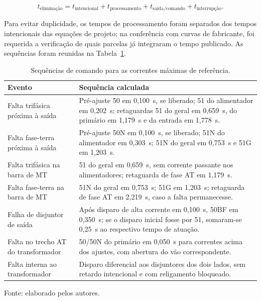 \begin{equation}
    t_{\text{eliminação}}=
    t_{\text{intencional}}+t_{\text{processamento}}+
    t_{\text{saída/comando}}+t_{\text{interrupção}}.
    \label{eq:oc_eliminacao}
\end{equation}

Para evitar duplicidade, os tempos de processamento foram separados dos tempos intencionais das equações de projeto; na conferência com curvas de fabricante, foi requerida a verificação de quais parcelas já integraram o tempo publicado. As sequências foram reunidas na Tabela~\ref{tab:oc_eventos}.

\begin{table}[htbp]
    \centering
    \caption{Sequências de comando para as correntes máximas de referência.}
    \label{tab:oc_eventos}
    \begin{tabular}{p{4.1cm}p{10.8cm}}
        \hline
        \textbf{Evento} & \textbf{Sequência calculada}\\
        \hline
        Falta trifásica próxima à saída & Pré-ajuste 50 em 0,100~s, se liberado; 51 do alimentador em 0,202~s; retaguardas 51 do geral em 0,659~s, do primário em 1,179~s e da entrada em 1,778~s.\\
        Falta fase-terra próxima à saída & Pré-ajuste 50N em 0,100~s, se liberado; 51N do alimentador em 0,303~s; 51N do geral em 0,753~s e 51G em 1,203~s.\\
        Falta trifásica na barra de MT & 51 do geral em 0,659~s, sem corrente passante nos alimentadores; retaguarda de fase AT em 1,179~s.\\
        Falta fase-terra na barra de MT & 51N do geral em 0,753~s; 51G em 1,203~s; retaguarda de fase AT em 2,219~s, caso a falta permanecesse.\\
        Falha de disjuntor de saída & Após disparo de alta corrente em 0,100~s, 50BF em 0,350~s; se o disparo inicial fosse por 51, somaram-se 0,25~s ao respectivo tempo de atuação.\\
        Falta no trecho AT do transformador & 50/50N do primário em 0,050~s para correntes acima dos ajustes, com abertura do vão correspondente.\\
        Falta interna ao transformador & Disparo diferencial aos disjuntores dos dois lados, sem retardo intencional e com religamento bloqueado.\\
        \hline
    \end{tabular}
    \par\vspace{2pt}
    {\small Fonte: elaborado pelos autores.}
\end{table}

